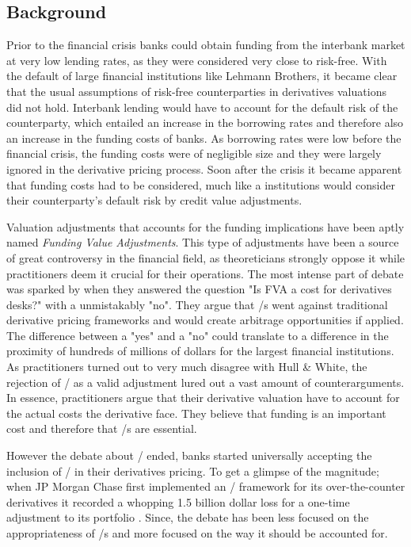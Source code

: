 \documentclass[main.tex]{subfiles}
\begin{document}
    \subsection{Background}
        
    Prior to the financial crisis banks could obtain funding from the interbank market
    at very low lending rates, as they were considered very close to risk-free.
    With the default of large financial institutions like Lehmann Brothers, 
    it became clear that the usual assumptions of risk-free counterparties 
    in derivatives valuations did not hold.
    Interbank lending would have to account for the default risk of the counterparty,
    which entailed an increase in the borrowing rates 
    and therefore also an increase in the funding costs of banks.
    As borrowing rates were low before the financial crisis, 
    the funding costs were of negligible size 
    and they were largely ignored in the derivative pricing process.
    Soon after the crisis it became apparent that funding costs had to be considered,
    much like a institutions would consider their counterparty's default risk by 
    credit value adjustments.

    Valuation adjustments that accounts for the funding implications 
    have been aptly named \textit{Funding Value Adjustments}.
    This type of adjustments have been a source of great controversy in the financial field,
    as theoreticians strongly oppose it while practitioners deem it crucial for their operations.
    The most intense part of debate was sparked by \textcite{HullWhite2012FVA}
    when they answered the question "Is FVA a cost for derivatives desks?" 
    with a unmistakably "no".
    They argue that \FVA/s went against traditional derivative pricing frameworks
    and would create arbitrage opportunities if applied.
    The difference between a "yes" and a "no" could translate to a difference 
    in the proximity of hundreds of millions of dollars for the largest financial institutions.
    As practitioners turned out to very much disagree with Hull \& White,
    the rejection of \FVA/ as a valid adjustment lured out a vast amount of counterarguments.
    In essence, practitioners argue that their derivative valuation 
    have to account for the actual costs the derivative face.
    They believe that funding is an important cost and therefore that \FVA/s are essential.

    However the debate about \FVA/ ended, banks started universally accepting the inclusion of \FVA/
    in their derivatives pricing.
    To get a glimpse of the magnitude; when JP Morgan Chase first implemented an \FVA/ framework
    for its over-the-counter derivatives it recorded a whopping 1.5 billion dollar loss
    for a one-time adjustment to its portfolio \textcite{JPMorganEarnings}.
    Since, the debate has been less focused on the appropriateness of \FVA/s
    and more focused on the way it should be accounted for.
\end{document}
